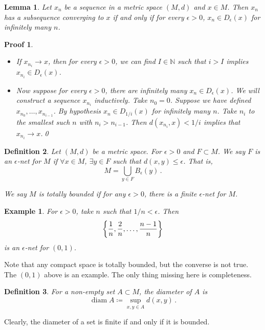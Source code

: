 \documentclass{article}
\theoremstyle{plain}\theoremheaderfont{\normalfont\itshape}\theorembodyfont{\rmfamily}\theoremseparator{.}\newtheorem*{rem}{Remark}\newtheorem*{ex}{Example}\newtheorem*{proof}{Proof}\newtheorem*{altp}{Alternative proof}
\theoremstyle{plain}\theoremheaderfont{\normalfont\bfseries}\theorembodyfont{\rmfamily}\theoremseparator{.}\newtheorem{thm}{Theorem}[section]\newtheorem{lem}[thm]{Lemma}\newtheorem{prop}[thm]{Proposition}\newtheorem*{cor}{Corollary}\newtheorem{defn}[thm]{Definition}\newtheorem{clm}[thm]{Claim}\newtheorem{clminproof}{Claim}
\theoremstyle{break}\theoremheaderfont{\normalfont\itshape}\theorembodyfont{\rmfamily}\theoremseparator{.\medskip}\newtheorem*{proofskip}{Proof}\newtheorem*{exs}{Examples}\newtheorem*{rems}{Remarks}
\theoremstyle{break}\theoremheaderfont{\normalfont\bfseries}\theorembodyfont{\rmfamily}\theoremseparator{.\medskip}\newtheorem{lemskip}[thm]{Lemma}\newtheorem{defnskip}[thm]{Definition}\newtheorem{propskip}[thm]{Proposition}\newtheorem{thmskip}[thm]{Theorem}
\newcommand{\qed}{\hfill\ensuremath{\Box}}
\DeclareMathOperator{\diam}{diam}
\begin{document}
    \begin{lem}
        Let \(x_n\) be a sequence in a metric space \((M,d)\) and \(x\in M\). Then \(x_n\) has a subsequence converging to \(x\) if and only if for every \(\epsilon>0\), \(x_n\in D_\epsilon(x)\) for infinitely many \(n\).
    \end{lem}
    \begin{proofskip}
        \begin{itemize}
            \item[(\(\Rightarrow\))] If \(x_{n_i}\to x\), then for every \(\epsilon>0\), we can find \(I\in\mathbb{N}\) such that \(i>I\) implies \(x_{n_i}\in D_\epsilon(x)\).
            \item[(\(\Leftarrow\))] Now suppose for every \(\epsilon>0\), there are infinitely many \(x_n\in D_\epsilon(x)\). We will construct a sequence \(x_{n_i}\) inductively. Take \(n_0=0\). Suppose we have defined \(x_{n_0},\dots,x_{n_{i-1}}\). By hypothesis \(x_n\in D_{1/i}(x)\) for infinitely many \(n\). Take \(n_i\) to the smallest such \(n\) with \(n_i>n_{i-1}\). Then \(d(x_{n_i},x)<1/i\) implies that \(x_{n_i}\to x\).\qed
        \end{itemize}
    \end{proofskip}

    \begin{defn}
        Let \((M,d)\) be a metric space. For \(\epsilon>0\) and \(F\subset M\). We say \(F\) is an \textit{\(\epsilon\)-net} for \(M\) if \(\forall x\in M\), \(\exists y\in F\) such that \(d(x,y)\le\epsilon\). That is,
        \[M=\bigcup_{y\in F}B_\epsilon(y)\,.\]

        We say \(M\) is \textit{totally bounded} if for any \(\epsilon>0\), there is a finite \(\epsilon\)-net for \(M\).
    \end{defn}
    \begin{ex}
        For \(\epsilon>0\), take \(n\) such that \(1/n<\epsilon\). Then
        \[\qty{\frac{1}{n},\frac{2}{n},\dots,\frac{n-1}{n}}\]
        is an \(\epsilon\)-net for \((0,1)\).
    \end{ex}

    Note that any compact space is totally bounded, but the converse is not true. The \((0,1)\) above is an example. The only thing missing here is completeness.

    \begin{defn}
        For a non-empty set \(A\subset M\), the \textit{diameter} of \(A\) is
        \[\diam A\coloneqq\sup_{x,y\in A}d(x,y)\,.\]        
    \end{defn}
    Clearly, the diameter of a set is finite if and only if it is bounded.
\end{document}
